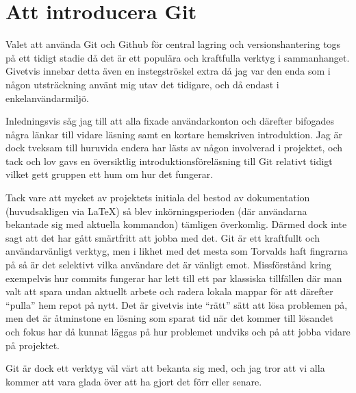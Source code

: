 \section{Att introducera Git}

Valet att använda Git och Github för central lagring och versionshantering togs på ett tidigt stadie då det är ett populära och kraftfulla verktyg i sammanhanget. Givetvis innebar detta även en instegströskel extra då jag var den enda som i någon utsträckning använt mig utav det tidigare, och då endast i enkelanvändarmiljö.

Inledningsvis såg jag till att alla fixade användarkonton och därefter bifogades några länkar till vidare läsning samt en kortare hemskriven introduktion. Jag är dock tveksam till huruvida endera har lästs av någon involverad i projektet, och tack och lov gavs en översiktlig introduktionsföreläsning till Git relativt tidigt vilket gett gruppen ett hum om hur det fungerar.

Tack vare att mycket av projektets initiala del bestod av dokumentation (huvudsakligen via \LaTeX) så blev inkörningsperioden (där användarna bekantade sig med aktuella kommandon) tämligen överkomlig. Därmed dock inte sagt att det har gått smärtfritt att jobba med det. Git är ett kraftfullt och användarvänligt verktyg, men i likhet med det mesta som Torvalds haft fingrarna på så är det selektivt vilka användare det är vänligt emot. Missförstånd kring exempelvis hur commits fungerar har lett till ett par klassiska tillfällen där man valt att spara undan aktuellt arbete och radera lokala mappar för att därefter ``pulla'' hem repot på nytt. Det är givetvis inte ``rätt'' sätt att lösa problemen på, men det är åtminstone en lösning som sparat tid när det kommer till lösandet och fokus har då kunnat läggas på hur problemet undviks och på att jobba vidare på projektet.

Git är dock ett verktyg väl värt att bekanta sig med, och jag tror att vi alla kommer att vara glada över att ha gjort det förr eller senare.
